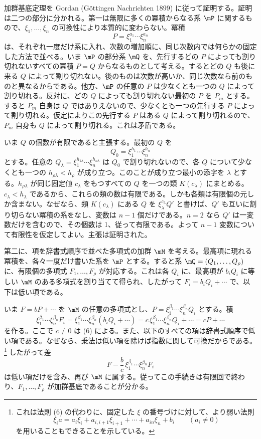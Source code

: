 \documentclass[11pt]{article}
\begin{document}
加群基底定理を Gordan (Göttingen Nachrichten 1899) に従って証明する。証明は二つの部分に分かれる。第一は無限に多くの冪積からなる系 $\mP$ に関するもので、$\xi_1,
\ldots,\xi_n$ の可換性により本質的に変わらない。冪積
\[
 P=\xi_1^{a_1}\cdots\xi_n^{a_n}
\]
は、それぞれ一度だけ系に入れ、次数の増加順に、同じ次数内では何らかの固定した方法で並べる。いま $\mP$ の部分系 $\mQ$ を、先行するどの $P$ によっても割り切れないすべての冪積 $P=Q$ からなるものとして考える。するとどの $Q$ も後に来る $Q$ によって割り切れない。後のものは次数が高いか、同じ次数なら前のものと異なるからである。他方、$\mP$ の任意の $P$ は少なくとも一つの $Q$ によって割り切れる。反対に、どの $Q$ によっても割り切れない最初の $P$ を $P_m$ とする。すると $P_m$ 自身は $Q$ ではありえないので、少なくとも一つの先行する $P$ によって割り切れる。仮定によりこの先行する $P$ はある $Q$ によって割り切れるので、$P_m$ 自身も $Q$ によって割り切れる。これは矛盾である。

いま $Q$ の個数が有限であると主張する。最初の $Q$ を
\[
 Q_0=\xi_1^{h_1}\cdots\xi_n^{h_n}
\]
とする。任意の $Q_\lambda=\xi_1^{h_{1\lambda}}\cdots\xi_n^{h_{n\lambda}}$ は $Q_0$ で割り切れないので、各 $Q$ について少なくとも一つの $h_{\rho\lambda}<h_\rho$ が成り立つ。このことが成り立つ最小の添字を $\lambda$ とする。$h_{\rho\lambda}$ が同じ固定値 $c_\lambda$ をもつすべての $Q$ を一つの類 $K(c_\lambda)$ にまとめる。$c_\lambda<h_\lambda$ であるから、これらの類の数は有限である。しかも各類は有限個の元しか含まない。なぜなら、類 $K(c_\lambda)$ にある $Q$ を $\xi_\lambda^{c_\lambda}Q'$ と書けば、$Q'$ も互いに割り切らない冪積の系をなし、変数は $n-1$ 個だけである。$n=2$ なら $Q'$ は一変数だけを含むので、その個数は 1、従って有限である。よって $n-1$ 変数について有限性を仮定してよい。主張は証明された。

第二に、項を辞書式順序で並べた多項式の加群 $\mM$ を考える。最高項に現れる冪積を、各々一度だけ書いた系を $\mP$ とする。すると系 $\mQ=(Q_1,
\ldots,Q_\rho)$ に、有限個の多項式 $F_1,
\ldots,F_\rho$ が対応する。これは各 $Q_i$ に、最高項が $b_iQ_i$ に等しい $\mM$ のある多項式を割り当てて得られ、したがって $F_i=b_iQ_i+
\cdots$ で、以下は低い項である。

いま $F=bP+\cdots$ を $\mM$ の任意の多項式とし、$P=\xi_1^{\beta_1}\cdots\xi_n^{\beta_n}Q_i$ とする。積
\[
 \xi_1^{\beta_1}\cdots\xi_n^{\beta_n}F_i
 =\xi_1^{\beta_1}\cdots\xi_n^{\beta_n}(b_iQ_i+\cdots)
 =c\,\xi_1^{\beta_1}\cdots\xi_n^{\beta_n}Q_i+\cdots
 =cP+\cdots
\]
を作る。ここで $c\ne0$ は (6) による。また、以下のすべての項は辞書式順序で低い項である。なぜなら、乗法は低い項を除けば指数に関して可換だからである。\footnote{これは法則 (6) の代わりに、固定した $\xi$ の番号づけに対して、より弱い法則
\[
 \xi_i a=a_i\xi_i+a_{i,i+1}\xi_{i+1}+\cdots+a_{in}\xi_n+b_i\qquad(a_i\ne0)
\]
を用いることもできることを示している。} したがって差
\[
 F-\frac bc\,\xi_1^{\beta_1}\cdots\xi_n^{\beta_n}F_i
\]
は低い項だけを含み、再び $\mM$ に属する。従ってこの手続きは有限回で終わり、$F_1,
\ldots,F_\rho$ が加群基底であることが分かる。
\end{document}
